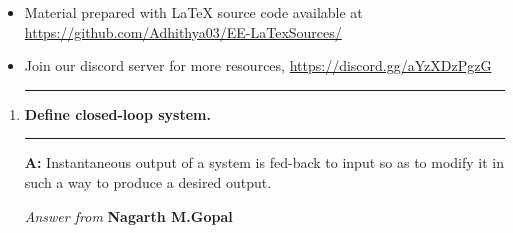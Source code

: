 \documentclass[12pt,a4paper]{article}
\newcommand\question[1]{\item\vspace{.25in}\hrule\textbf{#1}\vspace{.5em}\hrule\vspace{.10in}}
\newcommand\answer{\vspace{.10in}\textbf{A: }}
\newcommand\justurl[1]{\textcolor{urlBlue}{{\url{#1}}}}
\newcommand\Red[1]{\textit{Answer from} \textbf{{#1}}}
\newcommand\p{\item}
\newcommand\h[1]{\colorbox{voxYellow}{#1}}
\begin{document}
\raggedright

\begin{itemize} 
    \p[$\rightarrow$] Material prepared with \LaTeX{} source code available at \justurl{https://github.com/Adhithya03/EE-LaTexSources/}\\

    \p[$\rightarrow$] Join our discord server for more resources, \justurl{https://discord.gg/aYzXDzPgzG}
\end{itemize}
\begin{enumerate}

\question{Define closed-loop system.}

\answer Instantaneous output of a system is \h{fed-back} to input so as to modify it in such a way to produce a desired output.

\Red{Nagarth M.Gopal}

\end{enumerate}
\end{document}
